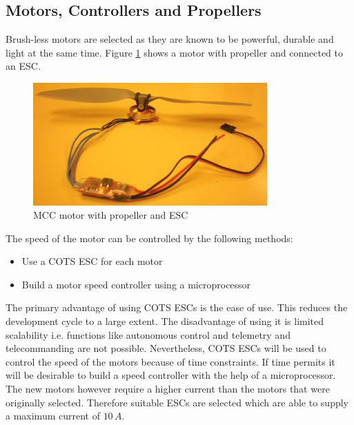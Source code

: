 \subsection{Motors, Controllers and Propellers}
%
Brush-less motors are selected as they are known to be powerful, durable and light at the same time. Figure \ref{fig:Motors} shows a motor with propeller and connected to an \ac{ESC}.
%
\begin{figure}[h]
\centering
\includegraphics[width=0.8\textwidth]{figures/fig_CDR_MCC_motor_with_propeller_esc.jpg}
\caption{MCC motor with propeller and ESC}
\label{fig:Motors}
\end{figure}
%
The speed of the motor can be controlled by the following methods:
%
\begin{itemize}
\item Use a \ac{COTS} \ac{ESC} for each motor
\item Build a motor speed controller using a microprocessor
\end{itemize}
%
The primary advantage of using \ac{COTS} \ac{ESC}s is the ease of use. This reduces the development cycle to a large extent. The disadvantage of using it is limited scalability i.e. functions like autonomous control and telemetry and telecommanding are not possible. Nevertheless, \ac{COTS} \ac{ESC}s will be used to control the speed of the motors because of time constraints. If time permits it will be desirable to build a speed controller with the help of a microprocessor. The new motors however require a higher current than the motors that were originally selected. Therefore suitable \ac{ESC}s are selected which are able to supply a maximum current of $10\,A$.
%
